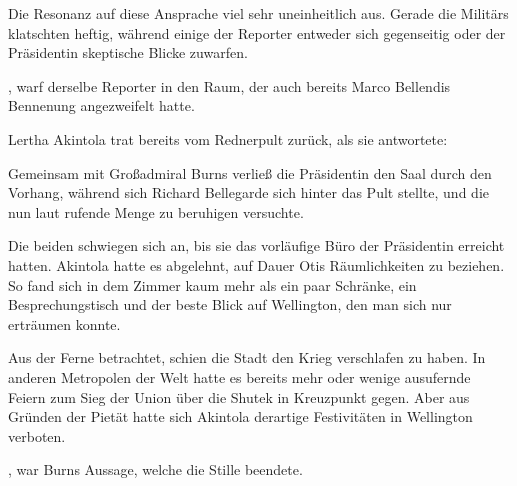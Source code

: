 \par

Die Resonanz auf diese Ansprache viel sehr uneinheitlich aus. Gerade die Militärs klatschten heftig, während einige der Reporter entweder sich gegenseitig oder der Präsidentin skeptische Blicke zuwarfen.

\par

, warf derselbe Reporter in den Raum, der auch bereits Marco Bellendis Bennenung angezweifelt hatte.

\par

Lertha Akintola trat bereits vom Rednerpult zurück, als sie antwortete: 

\par

Gemeinsam mit Großadmiral Burns verließ die Präsidentin den Saal durch den Vorhang, während sich Richard Bellegarde sich hinter das Pult stellte, und die nun laut rufende Menge zu beruhigen versuchte.

\par

Die beiden schwiegen sich an, bis sie das vorläufige Büro der Präsidentin erreicht hatten. Akintola hatte es abgelehnt, auf Dauer Otis Räumlichkeiten zu beziehen. So fand sich in dem Zimmer kaum mehr als ein paar Schränke, ein Besprechungstisch und der beste Blick auf Wellington, den man sich nur erträumen konnte.

\par

Aus der Ferne betrachtet, schien die Stadt den Krieg verschlafen zu haben. In anderen Metropolen der Welt hatte es bereits mehr oder wenige ausufernde Feiern zum Sieg der Union über die Shutek in Kreuzpunkt gegen. Aber aus Gründen der Pietät hatte sich Akintola derartige Festivitäten in Wellington verboten.

\par

, war Burns Aussage, welche die Stille beendete.

\par

